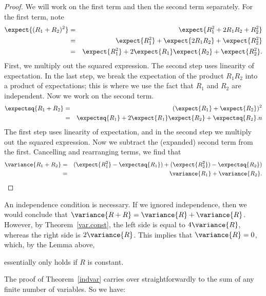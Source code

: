 \begin{proof}
We will work on the first term and then the second term separately.
For the first term, note\begin{eqnarray*}
\expect{(R_1+R_2)^2}
& = &   \expect{R_1^2 + 2 R_1 R_2 + R_2^2} \\
& = &   \expect{R_1^2} + \expect{2 R_1 R_2} + \expect{R_2^2} \\
& = &   \expect{R_1^2} + 2 \expect{R_1} \expect{R_2} + \expect{R_2^2}.
\end{eqnarray*}
First, we multiply out the squared expression.  The second step uses
linearity of expectation.  In the last step, we break the
expectation of the product $R_1 R_2$ into a product of expectations;
this is where we use the fact that $R_1$ and $R_2$ are independent.
Now we work on the second term.
\begin{eqnarray*}
\expectsq{R_1+R_2} & = & (\expect{R_1} + \expect{R_2})^2 \\
& = & \expectsq{R_1} + 2 \expect{R_1} \expect{R_2} + \expectsq{R_2}.
n\end{eqnarray*}
The first step uses linearity of expectation, and in the second step
we multiply out the squared expression.  Now we subtract the
(expanded) second term from the first. Cancelling and rearranging
terms, we find that
\begin{eqnarray*}
\variance{R_1 + R_2} & = &   (\expect{R_1^2} - \expectsq{R_1}) +
(\expect{R_2^2}) - \expectsq{R_2}) \\
& = &   \variance{R_1} + \variance{R_2}.
\end{eqnarray*}
\fi
\end{proof}

An independence condition is necessary.  If we ignored independence, then
we would conclude that $\variance{R + R} = \variance{R} + \variance{R}$.
However, by Theorem~\ref{var.const}, the left side is equal to $4
\variance{R}$, whereas the right side is $2 \variance{R}$.  This implies
that $\variance{R}=0$, which, by the Lemma above,
\iffalse Lemma~\ref{zvar}\fi
essentially only holds if $R$ is constant.

The proof of Theorem~\ref{indvar} carries over straightforwardly to
the sum of any finite number of variables.  So we have:

